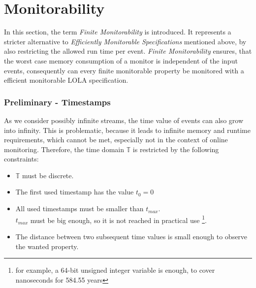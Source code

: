 \section{Monitorability}
	In this section, the term \textit{Finite Monitorability} is introduced. It represents a stricter alternative to \textit{Efficiently Monitorable Specifications} mentioned above, by also restricting the allowed run time per event. \textit{Finite Monitorability} ensures, that the worst case memory consumption of a monitor is independent of the input events, consequently can every finite monitorable property be monitored with a efficient monitorable LOLA specification. 
	\subsubsection{Preliminary - Timestamps}
		\label{monitorability_timestamps}
		As we consider possibly infinite streams, the time value of events can also grow into infinity. This is problematic, because it leads to infinite memory and runtime requirements, which cannot be met, especially not in the context of online monitoring. Therefore, the time domain $\mathbb{T}$ is restricted by the following constraints:
		\begin{itemize}
			\item
				$\mathbb{T}$ must be discrete.
			\item
				The first used timestamp has the value $t_0=0$
			\item
				All used timestamps must be smaller than $t_{max}$.\\
				$t_{max}$ must be big enough, so it is not reached in practical use \footnote{for example, a 64-bit unsigned integer variable is enough, to cover nanoseconds for 584.55 years}.
			\item
				The distance between two subsequent time values is small enough to observe the wanted property.
		\end{itemize}

